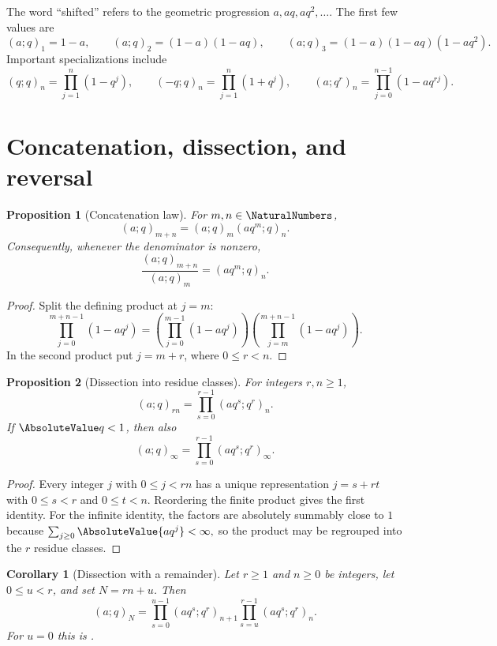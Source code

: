 \documentclass[11pt,a4paper,oneside,openany]{book}
\newtheorem{proposition}[proposition]{Proposition}
\newtheorem{corollary}[corollary]{Corollary}
\theoremstyle{definition}
\theoremstyle{remark}
\begin{document}
The word ``shifted'' refers to the geometric progression $a,aq,aq^2,\ldots$.  The first few values are
\[
 (a;q)_1=1-a,
 \qquad
 (a;q)_2=(1-a)(1-aq),
 \qquad
 (a;q)_3=(1-a)(1-aq)(1-aq^2).
\]
Important specializations include
\[
 (q;q)_n=\prod_{j=1}^n(1-q^j),
 \qquad
 (-q;q)_n=\prod_{j=1}^n(1+q^j),
 \qquad
 (a;q^r)_n=\prod_{j=0}^{n-1}(1-aq^{rj}).
\]

\section{Concatenation, dissection, and reversal}

\begin{proposition}[Concatenation law]\label{prop:concat}
For $m,n\in\NaturalNumbers$,
\[
 (a;q)_{m+n}=(a;q)_m(aq^m;q)_n.
\]
Consequently, whenever the denominator is nonzero,
\[
 \frac{(a;q)_{m+n}}{(a;q)_m}=(aq^m;q)_n.
\]
\end{proposition}

\begin{proof}
Split the defining product at $j=m$:
\[
 \prod_{j=0}^{m+n-1}(1-aq^j)
 =\left(\prod_{j=0}^{m-1}(1-aq^j)\right)
  \left(\prod_{j=m}^{m+n-1}(1-aq^j)\right).
\]
In the second product put $j=m+r$, where $0\le r<n$.
\end{proof}

\begin{proposition}[Dissection into residue classes]\label{prop:dissection}
For integers $r,n\ge1$,
\[
 (a;q)_{rn}=\prod_{s=0}^{r-1}(aq^s;q^r)_n.
\]
If $\AbsoluteValue q<1$, then also
\[
 (a;q)_\infty=\prod_{s=0}^{r-1}(aq^s;q^r)_\infty.
\]
\end{proposition}

\begin{proof}
Every integer $j$ with $0\le j<rn$ has a unique representation $j=s+rt$ with $0\le s<r$ and $0\le t<n$.  Reordering the finite product gives the first identity.  For the infinite identity, the factors are absolutely summably close to $1$ because
\(
 \sum_{j\ge0}\AbsoluteValue{a q^j}<\infty,
\)
so the product may be regrouped into the $r$ residue classes.
\end{proof}

\begin{corollary}[Dissection with a remainder]\label{cor:dissection-remainder}
Let $r\ge1$ and $n\ge0$ be integers, let $0\le u<r$, and set $N=rn+u$.  Then
\[
 (a;q)_N
 =\prod_{s=0}^{u-1}(aq^s;q^r)_{n+1}
  \prod_{s=u}^{r-1}(aq^s;q^r)_n .
\]
For $u=0$ this is .
\end{corollary}
\end{document}
